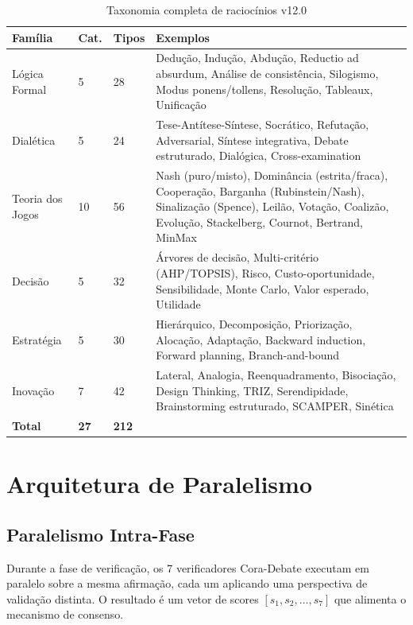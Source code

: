 \documentclass[12pt,a4paper,sumario=tradicional]{abntex2}
\begin{document}
\begin{table}[H]
\centering
\caption{Taxonomia completa de raciocínios v12.0}
\label{tab:taxonomy-full}
\begin{tabular}{@{}llll@{}}
\toprule
\textbf{Família} & \textbf{Cat.} & \textbf{Tipos} & \textbf{Exemplos} \\
\midrule
Lógica Formal & 5 & 28 & Dedução, Indução, Abdução, Reductio ad absurdum, Análise de consistência, Silogismo, Modus ponens/tollens, Resolução, Tableaux, Unificação \\
Dialética & 5 & 24 & Tese-Antítese-Síntese, Socrático, Refutação, Adversarial, Síntese integrativa, Debate estruturado, Dialógica, Cross-examination \\
Teoria dos Jogos & 10 & 56 & Nash (puro/misto), Dominância (estrita/fraca), Cooperação, Barganha (Rubinstein/Nash), Sinalização (Spence), Leilão, Votação, Coalizão, Evolução, Stackelberg, Cournot, Bertrand, MinMax \\
Decisão & 5 & 32 & Árvores de decisão, Multi-critério (AHP/TOPSIS), Risco, Custo-oportunidade, Sensibilidade, Monte Carlo, Valor esperado, Utilidade \\
Estratégia & 5 & 30 & Hierárquico, Decomposição, Priorização, Alocação, Adaptação, Backward induction, Forward planning, Branch-and-bound \\
Inovação & 7 & 42 & Lateral, Analogia, Reenquadramento, Bisociação, Design Thinking, TRIZ, Serendipidade, Brainstorming estruturado, SCAMPER, Sinética \\
\midrule
\textbf{Total} & \textbf{27} & \textbf{212} & \\
\bottomrule
\end{tabular}
\end{table}

\section{Arquitetura de Paralelismo}

\subsection{Paralelismo Intra-Fase}

Durante a fase de verificação, os 7 verificadores Cora-Debate executam em paralelo sobre a mesma afirmação, cada um aplicando uma perspectiva de validação distinta. O resultado é um vetor de scores $[s_1, s_2, \ldots, s_7]$ que alimenta o mecanismo de consenso.
\end{document}
